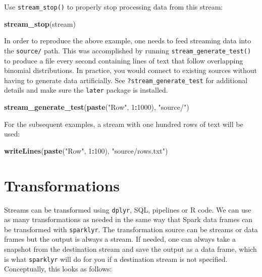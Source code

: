 \documentclass[]{book}
\newenvironment{Shaded}{\begin{snugshade}}{\end{snugshade}}
\newcommand{\DecValTok}[1]{\textcolor[rgb]{0.00,0.00,0.81}{#1}}
\newcommand{\KeywordTok}[1]{\textcolor[rgb]{0.13,0.29,0.53}{\textbf{#1}}}
\newcommand{\NormalTok}[1]{#1}
\newcommand{\OperatorTok}[1]{\textcolor[rgb]{0.81,0.36,0.00}{\textbf{#1}}}
\newcommand{\StringTok}[1]{\textcolor[rgb]{0.31,0.60,0.02}{#1}}
\theoremstyle{definition}
\theoremstyle{definition}
\theoremstyle{definition}
\theoremstyle{remark}
\begin{document}
Use \texttt{stream\_stop()} to properly stop processing data from this
stream:

\begin{Shaded}
\begin{Highlighting}[]
\KeywordTok{stream_stop}\NormalTok{(stream)}
\end{Highlighting}
\end{Shaded}

In order to reproduce the above example, one needs to feed streaming
data into the \texttt{source/} path. This was accomplished by running
\texttt{stream\_generate\_test()} to produce a file every second
containing lines of text that follow overlapping binomial distributions.
In practice, you would connect to existing sources without having to
generate data artificially. See \texttt{?stream\_generate\_test} for
additional details and make sure the \texttt{later} package is
installed.

\begin{Shaded}
\begin{Highlighting}[]
\KeywordTok{stream_generate_test}\NormalTok{(}\KeywordTok{paste}\NormalTok{(}\StringTok{"Row"}\NormalTok{, }\DecValTok{1}\OperatorTok{:}\DecValTok{1000}\NormalTok{), }\StringTok{"source/"}\NormalTok{)}
\end{Highlighting}
\end{Shaded}

For the subsequent examples, a stream with one hundred rows of text will
be used:

\begin{Shaded}
\begin{Highlighting}[]
\KeywordTok{writeLines}\NormalTok{(}\KeywordTok{paste}\NormalTok{(}\StringTok{"Row"}\NormalTok{, }\DecValTok{1}\OperatorTok{:}\DecValTok{100}\NormalTok{), }\StringTok{"source/rows.txt"}\NormalTok{)}
\end{Highlighting}
\end{Shaded}

\hypertarget{transformations}{%
\section{Transformations}\label{transformations}}

Streams can be transformed using \texttt{dplyr}, SQL, pipelines or R
code. We can use as many transformations as needed in the same way that
Spark data frames can be transformed with \texttt{sparklyr}. The
transformation source can be streams or data frames but the output is
always a stream. If needed, one can always take a snapshot from the
destination stream and save the output as a data frame, which is what
\texttt{sparklyr} will do for you if a destination stream is not
specified. Conceptually, this looks as follows:
\end{document}
